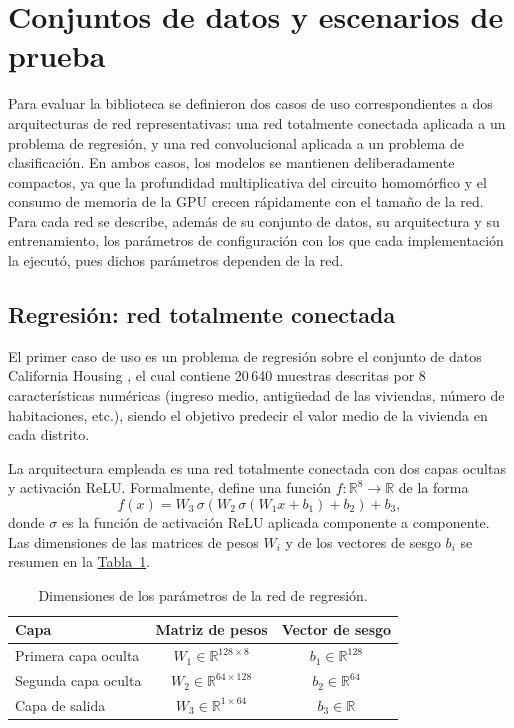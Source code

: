 \section{Conjuntos de datos y escenarios de prueba}\label{sec:metodo_modelos}

Para evaluar la biblioteca se definieron dos casos de uso correspondientes a dos arquitecturas de red representativas: una red totalmente conectada aplicada a un problema de regresión, y una red convolucional aplicada a un problema de clasificación. En ambos casos, los modelos se mantienen deliberadamente compactos, ya que la profundidad multiplicativa del circuito homomórfico y el consumo de memoria de la GPU crecen rápidamente con el tamaño de la red. Para cada red se describe, además de su conjunto de datos, su arquitectura y su entrenamiento, los parámetros de configuración con los que cada implementación la ejecutó, pues dichos parámetros dependen de la red.

\subsection{Regresión: red totalmente conectada}

El primer caso de uso es un problema de regresión sobre el conjunto de datos California Housing \cite{pace1997california}, el cual contiene 20\,640 muestras descritas por 8 características numéricas (ingreso medio, antigüedad de las viviendas, número de habitaciones, etc.), siendo el objetivo predecir el valor medio de la vivienda en cada distrito.

La arquitectura empleada es una red totalmente conectada con dos capas ocultas y activación ReLU. Formalmente, define una función $f : \mathbb{R}^{8} \to \mathbb{R}$ de la forma
\[
f(x) = W_3\,\sigma\!\left(W_2\,\sigma\!\left(W_1 x + b_1\right) + b_2\right) + b_3,
\]
donde $\sigma$ es la función de activación ReLU aplicada componente a componente. Las dimensiones de las matrices de pesos $W_i$ y de los vectores de sesgo $b_i$ se resumen en la \hyperref[tab:arq_mlp]{Tabla~\ref{tab:arq_mlp}}.

\begin{table}[h]
    \centering
    \caption{Dimensiones de los parámetros de la red de regresión.}\label{tab:arq_mlp}
    \vspace{0.5em}
    \begin{tabular}{| l | c | c |}
        \hline
        Capa & Matriz de pesos & Vector de sesgo \\
        \hline
        Primera capa oculta & $W_1 \in \mathbb{R}^{128 \times 8}$ & $b_1 \in \mathbb{R}^{128}$ \\
        \hline
        Segunda capa oculta & $W_2 \in \mathbb{R}^{64 \times 128}$ & $b_2 \in \mathbb{R}^{64}$ \\
        \hline
        Capa de salida & $W_3 \in \mathbb{R}^{1 \times 64}$ & $b_3 \in \mathbb{R}$ \\
        \hline
    \end{tabular}
\end{table}

